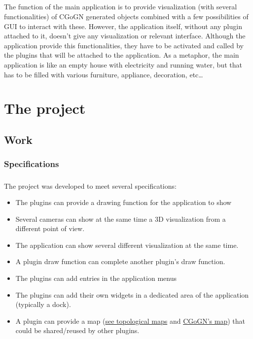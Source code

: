 \documentclass[a4paper]{scrreprt}
\begin{document}
	\paragraph{}
	The function of the main application is to provide visualization (with several
	functionalities) of CGoGN generated objects combined with a few possibilities
	of GUI to interact with these. However, the application itself, without any plugin attached to it,
	doesn't give any visualization or relevant interface. Although the application
	provide this functionalities, they have to be activated and called by the
	plugins that will be attached to the application. As a metaphor, the main
	application is like an empty house with electricity and running water, but that
	has to be filled with various furniture, appliance, decoration, etc\ldots
	
	
	
\chapter{The project}

\section{Work}
\subsection{Specifications}
	\paragraph{}
	The project was developed to meet several specifications:	
	\begin{itemize}
	  \item The plugins can provide a drawing function for the application to show
	  \item Several cameras can show at the same time a 3D visualization from a
	  different point of view.
	  \item The application can show several different visualization at the same
	  time.
	  \item A plugin draw function can complete another plugin's draw function.
	  \item The plugins can add entries in the application menus
	  \item The plugins can add their own widgets in a dedicated area of the
	  application (typically a dock).
	  \item A plugin can provide a map
	  (\href{http://en.wikipedia.org/wiki/Topological_map}{see topological maps}
	  and
	  \href{http://cgogn.u-strasbg.fr/Wiki/index.php/Topological_models}{CGoGN's
	  map}) that could be shared/reused by other plugins.
	\end{itemize}
	
\end{document}
